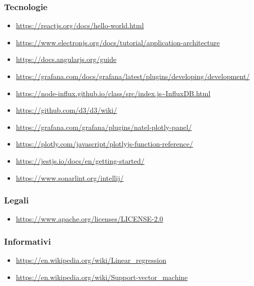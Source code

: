 \subsubsection{Tecnologie}
\begin{itemize}
	\item \url{https://reactjs.org/docs/hello-world.html}
	\item \url{https://www.electronjs.org/docs/tutorial/application-architecture}
	\item \url{https://docs.angularjs.org/guide}
	\item \url{https://grafana.com/docs/grafana/latest/plugins/developing/development/}
	\item \url{https://node-influx.github.io/class/src/index.js~InfluxDB.html}
	\item \url{https://github.com/d3/d3/wiki/}
	\item \url{https://grafana.com/grafana/plugins/natel-plotly-panel/}
	\item \url{https://plotly.com/javascript/plotlyjs-function-reference/}
	\item \url{https://jestjs.io/docs/en/getting-started/}
	\item \url{https://www.sonarlint.org/intellij/}
\end{itemize}
\subsubsection{Legali}
\begin{itemize}
	\item \url{https://www.apache.org/licenses/LICENSE-2.0}
\end{itemize}
\subsubsection{Informativi}
\begin{itemize}
	\item \url{https://en.wikipedia.org/wiki/Linear_regression}
	\item \url{https://en.wikipedia.org/wiki/Support-vector_machine}
\end{itemize}
